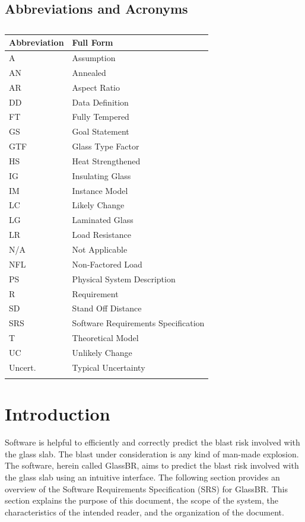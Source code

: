 \documentclass[12pt]{article}
\begin{document}
\subsection{Abbreviations and Acronyms}
\label{Sec:TAbbAcc}
\begin{longtable}{l l}
\toprule
Abbreviation & Full Form
\\
\midrule
\endhead
A & Assumption
\\
AN & Annealed
\\
AR & Aspect Ratio
\\
DD & Data Definition
\\
FT & Fully Tempered
\\
GS & Goal Statement
\\
GTF & Glass Type Factor
\\
HS & Heat Strengthened
\\
IG & Insulating Glass
\\
IM & Instance Model
\\
LC & Likely Change
\\
LG & Laminated Glass
\\
LR & Load Resistance
\\
N/A & Not Applicable
\\
NFL & Non-Factored Load
\\
PS & Physical System Description
\\
R & Requirement
\\
SD & Stand Off Distance
\\
SRS & Software Requirements Specification
\\
T & Theoretical Model
\\
UC & Unlikely Change
\\
Uncert. & Typical Uncertainty
\\
\bottomrule
\caption{}
\label{Table:TAbbAcc}
\end{longtable}
\section{Introduction}
\label{Sec:Intro}
Software is helpful to efficiently and correctly predict the blast risk involved with the glass slab. The blast under consideration is any kind of man-made explosion. The software, herein called GlassBR, aims to predict the blast risk involved with the glass slab using an intuitive interface.
The following section provides an overview of the Software Requirements Specification (SRS) for GlassBR. This section explains the purpose of this document, the scope of the system, the characteristics of the intended reader, and the organization of the document.
\end{document}
